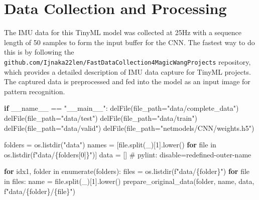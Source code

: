 \documentclass[
  9pt,
  letterpaper,
  abstract,
  titlepage]{scrbook}
\newenvironment{Shaded}{\begin{snugshade}}{\end{snugshade}}
\newcommand{\CharTok}[1]{\textcolor[rgb]{0.13,0.47,0.30}{#1}}
\newcommand{\ControlFlowTok}[1]{\textcolor[rgb]{0.00,0.23,0.31}{\textbf{#1}}}
\newcommand{\DecValTok}[1]{\textcolor[rgb]{0.68,0.00,0.00}{#1}}
\newcommand{\NormalTok}[1]{\textcolor[rgb]{0.00,0.23,0.31}{#1}}
\newcommand{\OperatorTok}[1]{\textcolor[rgb]{0.37,0.37,0.37}{#1}}
\newcommand{\StringTok}[1]{\textcolor[rgb]{0.13,0.47,0.30}{#1}}
\begin{document}
\section{Data Collection and
Processing}\label{data-collection-and-processing}

The IMU data for this TinyML model was collected at 25Hz with a sequence
length of 50 samples to form the input buffer for the CNN. The fastest
way to do this is by following the
\texttt{github.com/Ijnaka22len/FastDataCollection4MagicWangProjects}
repository, which provides a detailed description of IMU data capture
for TinyML projects. The captured data is preprocessed and fed into the
model as an input image for pattern recognition.

\begin{Shaded}
\begin{Highlighting}[]
\ControlFlowTok{if}\NormalTok{ \_\_name\_\_ }\OperatorTok{==} \StringTok{"\_\_main\_\_"}\OperatorTok{:}
\NormalTok{    delFile}\OperatorTok{(}\NormalTok{file\_path}\OperatorTok{=}\StringTok{"data/complete\_data"}\OperatorTok{)}
\NormalTok{    delFile}\OperatorTok{(}\NormalTok{file\_path}\OperatorTok{=}\StringTok{"data/test"}\OperatorTok{)}
\NormalTok{    delFile}\OperatorTok{(}\NormalTok{file\_path}\OperatorTok{=}\StringTok{"data/train"}\OperatorTok{)}
\NormalTok{    delFile}\OperatorTok{(}\NormalTok{file\_path}\OperatorTok{=}\StringTok{"data/valid"}\OperatorTok{)}
\NormalTok{    delFile}\OperatorTok{(}\NormalTok{file\_path}\OperatorTok{=}\StringTok{"netmodels/CNN/weights.h5"}\OperatorTok{)}

\NormalTok{    folders }\OperatorTok{=}\NormalTok{ os}\OperatorTok{.}\NormalTok{listdir}\OperatorTok{(}\StringTok{"data"}\OperatorTok{)}
\NormalTok{    names }\OperatorTok{=} \OperatorTok{[}\NormalTok{file}\OperatorTok{.}\NormalTok{split}\OperatorTok{(}\CharTok{\textquotesingle{}\_\textquotesingle{}}\OperatorTok{)[}\DecValTok{1}\OperatorTok{].}\NormalTok{lower}\OperatorTok{()} \ControlFlowTok{for}\NormalTok{ file in os}\OperatorTok{.}\NormalTok{listdir}\OperatorTok{(}\NormalTok{f}\StringTok{"data/\{folders[0]\}"}\OperatorTok{)]}
\NormalTok{    data }\OperatorTok{=} \OperatorTok{[]}\NormalTok{  \# pylint}\OperatorTok{:}\NormalTok{ disable}\OperatorTok{=}\NormalTok{redefined}\OperatorTok{{-}}\NormalTok{outer}\OperatorTok{{-}}\NormalTok{name}

    \ControlFlowTok{for}\NormalTok{ idx1}\OperatorTok{,}\NormalTok{ folder in enumerate}\OperatorTok{(}\NormalTok{folders}\OperatorTok{):}
\NormalTok{        files }\OperatorTok{=}\NormalTok{ os}\OperatorTok{.}\NormalTok{listdir}\OperatorTok{(}\NormalTok{f}\StringTok{"data/\{folder\}"}\OperatorTok{)}
        \ControlFlowTok{for}\NormalTok{ file in files}\OperatorTok{:}
\NormalTok{            name }\OperatorTok{=}\NormalTok{ file}\OperatorTok{.}\NormalTok{split}\OperatorTok{(}\CharTok{\textquotesingle{}\_\textquotesingle{}}\OperatorTok{)[}\DecValTok{1}\OperatorTok{].}\NormalTok{lower}\OperatorTok{()}
\NormalTok{            prepare\_original\_data}\OperatorTok{(}\NormalTok{folder}\OperatorTok{,}\NormalTok{ name}\OperatorTok{,}\NormalTok{ data}\OperatorTok{,}\NormalTok{ f}\StringTok{"data/\{folder\}/\{file\}"}\OperatorTok{)}


\end{Highlighting}
\end{Shaded}
\end{document}

